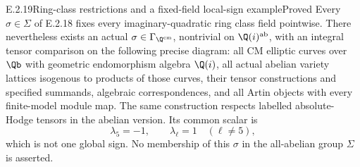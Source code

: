 
\begin{result}{E.2.19}{Ring-class restrictions and a fixed-field local-sign example}{Proved}
Every \(\sigma\in\Sigma\) of E.2.18 fixes every imaginary-quadratic
ring class field pointwise. There nevertheless exists an actual
\(\sigma\in\Gamma_{\Q^{\mathrm{cm}}}\), nontrivial on
\(\Q(i)^{\mathrm{ab}}\), with an integral tensor comparison on the
following precise diagram: all CM elliptic curves over \(\Qb\)
with geometric endomorphism algebra \(\Q(i)\), all actual abelian
variety lattices isogenous to products of those curves, their
tensor constructions and specified summands, algebraic
correspondences, and all Artin objects with every finite-model
module map. The same construction respects labelled
absolute-Hodge tensors in the abelian version.
Its common scalar is
\[
 \lambda_5=-1,\qquad \lambda_\ell=1\quad(\ell\ne5),
 \tag{E.2.19a}
\]
which is not one global sign. No membership of this \(\sigma\)
in the all-abelian group \(\Sigma\) is asserted.
\end{result}
